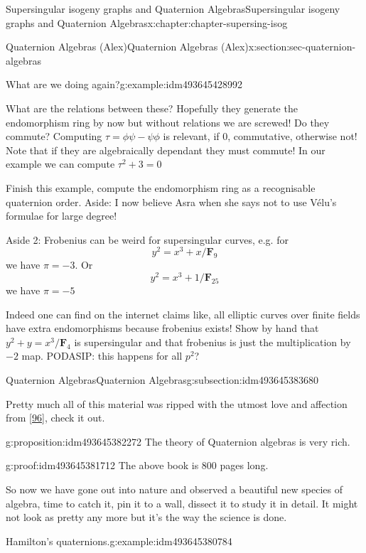 \documentclass[oneside,10pt,]{book}
\numberwithin{equation}{section}
\newcommand{\FF}{\mathbf{F}}
\begin{document}
\begin{chapterptx}{Supersingular isogeny graphs and Quaternion Algebras}{}{Supersingular isogeny graphs and Quaternion Algebras}{}{}{x:chapter:chapter-supersing-isog}
\begin{sectionptx}{Quaternion Algebras (Alex)}{}{Quaternion Algebras (Alex)}{}{}{x:section:sec-quaternion-algebras}
\begin{introduction}{}
\begin{example}{What are we doing again?}{g:example:idm493645428992}
\par
What are the relations between these? Hopefully they generate the endomorphism ring by now but without relations we are screwed! Do they commute? Computing \(\tau = \phi \psi  - \psi \phi\) is relevant, if 0, commutative, otherwise not! Note that if they are algebraically dependant they must commute! In our example we can compute \(\tau^2 + 3 = 0\)%
\end{example}
Finish this example, compute the endomorphism ring as a recognisable quaternion order.%
Aside: I now believe Asra when she says not to use Vélu's formulae for large degree!%
\par
Aside 2: Frobenius can be weird for supersingular curves, e.g. for%
\begin{equation*}
y^2 = x^{3} + x/\FF_9
\end{equation*}
we have \(\pi = -3\). Or%
\begin{equation*}
y^2 = x^{3} + 1/\FF_{25}
\end{equation*}
we have \(\pi = -5\)%
\par
Indeed one can find on the internet claims like, all elliptic curves over finite fields have extra endomorphisms because frobenius exists!%
Show by hand that \(y^2 + y = x^3/\FF_4\) is supersingular and that frobenius is just the multiplication by \(-2\) map.%
PODASIP: this happens for all \(p^2\)?%
\end{introduction}%
%
%
\typeout{************************************************}
\typeout{************************************************}
%
\begin{subsectionptx}{Quaternion Algebras}{}{Quaternion Algebras}{}{}{g:subsection:idm493645383680}
\begin{introduction}{}%
Pretty much all of this material was ripped with the utmost love and affection from \hyperlink{x:biblio:bib-voight-quat}{[96]}, check it out.%
\begin{proposition}{}{}{g:proposition:idm493645382272}%
The theory of Quaternion algebras is very rich.%
\end{proposition}
\begin{proofptx}{}{g:proof:idm493645381712}
The above book is 800 pages long.%
\end{proofptx}
So now we have gone out into nature and observed a beautiful new species of algebra, time to catch it, pin it to a wall, dissect it to study it in detail. It might not look as pretty any more but it's the way the science is done.%
\begin{example}{Hamilton's quaternions.}{g:example:idm493645380784}%

\end{example}
\end{introduction}
\end{subsectionptx}
\end{sectionptx}
\end{chapterptx}
\end{document}
